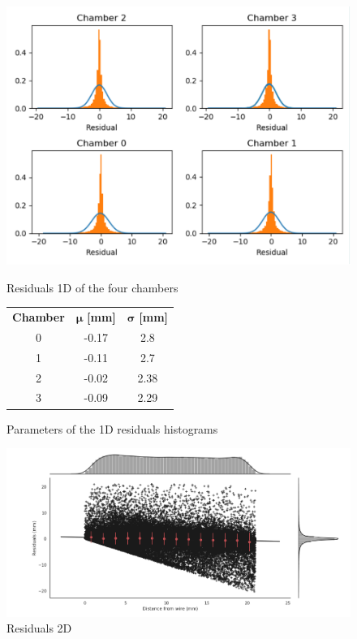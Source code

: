 \documentclass[a4paper,11pt]{book}
\begin{document}
\begin{figure}[hbtp]
\begin{minipage}[c]{0.6\textwidth}
\centering
\includegraphics[scale=0.6]{pictures/Residuals_1D.pdf}
\caption{Residuals 1D of the four chambers}
\label{fig:res1D}
\end{minipage}\quad
\begin{minipage}[c]{0.4\textwidth}
\begin{tabular}{c | c  c}
\toprule
 \textbf{Chamber} & $\bm{\mu}$\textbf{ [mm]} & $\bm{\sigma}$\textbf{ [mm]}\\
0 & -0.17 & 2.8\\
1 & -0.11 & 2.7\\
2 & -0.02 & 2.38\\
3 &-0.09  & 2.29\\
\bottomrule
\end{tabular}
\caption{Parameters of the 1D residuals histograms}
\label{tab:res1D}
\end{minipage}
\end{figure}

\begin{figure}[hbtp]
\centering
\includegraphics[scale=0.4]{pictures/Residuals_2D.pdf}
\caption{Residuals 2D}
\label{fig:res2D}
\end{figure}
\end{document}
